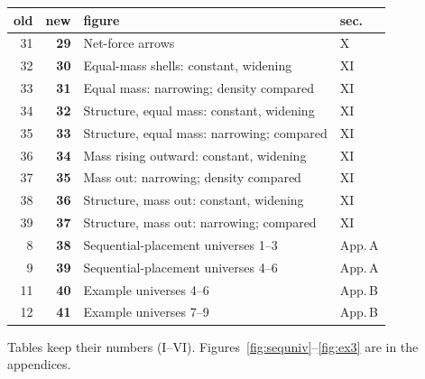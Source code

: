 \begin{center}\scriptsize\setlength{\tabcolsep}{3pt}
\begin{tabular}{rrll}
\toprule
old & new & figure & sec.\\
\midrule
31 & \textbf{29} & Net-force arrows & X\\
32 & \textbf{30} & Equal-mass shells: constant, widening & XI\\
33 & \textbf{31} & Equal mass: narrowing; density compared & XI\\
34 & \textbf{32} & Structure, equal mass: constant, widening & XI\\
35 & \textbf{33} & Structure, equal mass: narrowing; compared & XI\\
36 & \textbf{34} & Mass rising outward: constant, widening & XI\\
37 & \textbf{35} & Mass out: narrowing; density compared & XI\\
38 & \textbf{36} & Structure, mass out: constant, widening & XI\\
39 & \textbf{37} & Structure, mass out: narrowing; compared & XI\\
8 & \textbf{38} & Sequential-placement universes 1--3 & App.\,A\\
9 & \textbf{39} & Sequential-placement universes 4--6 & App.\,A\\
11 & \textbf{40} & Example universes 4--6 & App.\,B\\
12 & \textbf{41} & Example universes 7--9 & App.\,B\\
\bottomrule
\end{tabular}
\end{center}
Tables keep their numbers (I--VI). Figures~\ref{fig:sequniv}--\ref{fig:ex3} are in the appendices.

